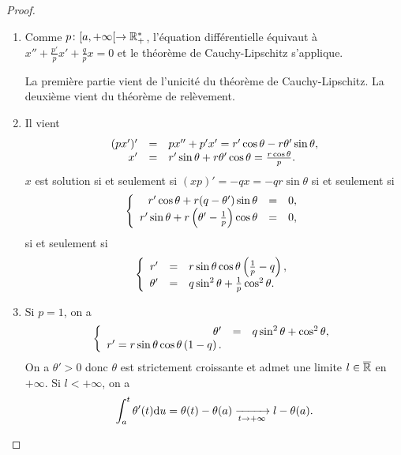 \documentclass[12pt]{article}
\begin{document}
\begin{proof}
	\phantom{}
	\begin{enumerate}
		\item Comme $p\colon[a,+\infty[\to\mathbb{R}_{+}^{*}$, l'équation différentielle équivaut à $x''+\frac{p'}{p}x'+\frac{q}{p}x=0$ et le théorème de Cauchy-Lipschitz s'applique.
		
		La première partie vient de l'unicité du théorème de Cauchy-Lipschitz. La deuxième vient du théorème de relèvement.

		\item Il vient
		\begin{equation}
			\begin{array}[]{rcl}
				(px')'&=&px''+p'x'=r'\cos\theta-r\theta'\sin\theta,\\
				x' &=& r'\sin\theta+r\theta'\cos\theta=\frac{r\cos\theta}{p}.
			\end{array}
		\end{equation}
		$x$ est solution si et seulement si $(xp)'=-qx=-qr\sin\theta$ si et seulement si 
		\begin{equation}
			\left\lbrace
				\begin{array}[]{rcl}
					r'\cos\theta+r(q-\theta')\sin\theta &=&0,\\
					r'\sin\theta+r\left(\theta'-\frac{1}{p}\right)\cos\theta&=&0,
				\end{array}
			\right.
		\end{equation}
		si et seulement si 
		\begin{equation}
			\left\lbrace
			\begin{array}[]{rcl}
				r'&=&r\sin\theta\cos\theta\left(\frac{1}{p}-q\right),\\
				\theta'&=&q\sin^{2}\theta+\frac{1}{p}\cos^{2}\theta.
			\end{array}
			\right.
		\end{equation}

		\item Si $p=1$, on a 
		\begin{equation}
			\left\lbrace
				\begin{array}[]{rcl}
					\theta'&=&q\sin^{2}\theta+\cos^{2}\theta,\\
					r'=r\sin\theta\cos\theta\left(1-q\right).
				\end{array}
			\right.
		\end{equation}
		On a $\theta'>0$ donc $\theta$ est strictement croissante et admet une limite $l\in\overline{\mathbb{R}}$ en $+\infty$. Si $l<+\infty$, on a 
		\begin{equation}
			\int_{a}^{t}\theta'(t)\mathrm{d} u=\theta(t)-\theta(a)\xrightarrow[t\to+\infty]{}l-\theta(a).
		\end{equation}


\end{enumerate}
\end{proof}
\end{document}
